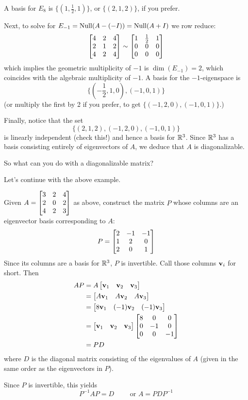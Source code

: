 \begin{myprob}
\begin{mysol}
A basis for $E_8$ is $\{(1,\frac12, 1)\}$, or $\{(2,1,2)\}$, if you
prefer.


Next, to solve for $E_{-1} = \operatorname{Null}(A-(-I))=\operatorname{Null}(A+I)$ we row reduce:
$$
\left[ \begin{matrix} 4 & 2              & 4 \\ 
2          & 1         & 2 \\ 
4          & 2     & 4 \end{matrix} \right]
\sim
\left[ \begin{matrix} 1 & \frac12 & 1\\ 0 & 0 & 0\\ 0 & 0 & 0 \end{matrix} \right]
$$
which implies the geometric multiplicity of $-1$ is $\dim(E_{-1}) = 2$, which coincides with
the algebraic multiplicity of $-1$.  A basis for the $-1$-eigenspace is
$$
\{ (-\frac12, 1, 0) , (-1, 0, 1)\}
$$
(or multiply the first by 2 if you prefer, to get $\{ (-1, 2, 0), (-1,0,1)\}$.)


Finally, notice that the set
$$
\{ (2,1,2), (-1,2,0), (-1,0,1)\}
$$
is linearly independent (check this!) and hence a basis for 
$\mathbb{R}^3$.  Since $\mathbb{R}^3$ has a basis consisting entirely of eigenvectors
of $A$, we deduce that $A$ is diagonalizable.
\end{mysol}\end{myprob}

So what can you do with a diagonalizable matrix?

Let's continue with the above example.

Given $A =  \left[ \begin{matrix} 3 & 2 & 4\\ 2& 0 & 2\\ 4 & 2 & 3 \end{matrix} \right]$ as above, construct
the matrix $P$ whose columns are an eigenvector basis corresponding to $A$:
$$
P = \left[ \begin{matrix} 2 & -1 & -1 \\ 1 & 2 & 0\\ 2 & 0 & 1 \end{matrix} \right]
$$
Since its columns are a basis for $\mathbb{R}^3$, $P$ is invertible.  Call those
columns $\mathbf{v}_i$ for short.
Then
\begin{align*}
AP &= A\left[ \begin{matrix} \mathbf{v}_1 & \mathbf{v}_2 & \mathbf{v}_3 \end{matrix} \right] \\
&=  \left[ \begin{matrix} A\mathbf{v}_1 & A\mathbf{v}_2 & A\mathbf{v}_3 \end{matrix} \right]\\
&= \left[ \begin{matrix} 8\mathbf{v}_1 & (-1)\mathbf{v}_2 & (-1)\mathbf{v}_3 \end{matrix} \right]\\
&= \left[ \begin{matrix} \mathbf{v}_1 & \mathbf{v}_2 & \mathbf{v}_3 \end{matrix} \right]\left[ \begin{matrix} 8 & 0 & 0\\ 0 & -1 & 0\\ 0 & 0 & -1 \end{matrix} \right]\\
&= PD
\end{align*}
where $D$ is the diagonal matrix consisting of the eigenvalues of $A$
(given in the same order as the eigenvectors in $P$).

Since $P$ is invertible, this yields
$$
 P^{-1}AP=D\qquad \text{ or } A = PDP^{-1}
$$


